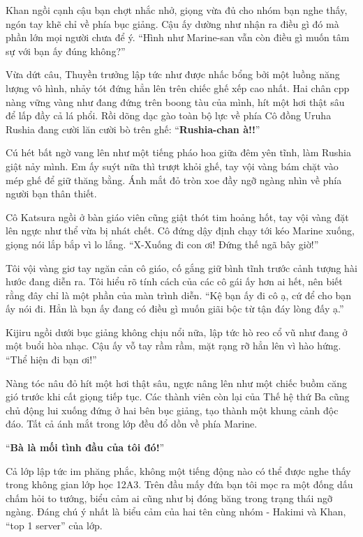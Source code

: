 \documentclass[../main.tex]{subfiles}
\begin{document}
Khan ngồi cạnh cậu bạn chợt nhắc nhở, giọng vừa đủ cho nhóm bạn nghe thấy, ngón tay khẽ chỉ về phía bục giảng. Cậu ấy dường như nhận ra điều gì đó mà phần lớn mọi người chưa để ý. ``Hình như Marine-san vẫn còn điều gì muốn tâm sự với bạn ấy đúng không?''

Vừa dứt câu, Thuyền trưởng lập tức như được nhấc bổng bởi một luồng năng lượng vô hình, nhảy tót đứng hẳn lên trên chiếc ghế xếp cao nhất. Hai chân cpp nàng vững vàng như đang đứng trên boong tàu của mình, hít một hơi thật sâu để lấp đầy cả lá phổi. Rồi dõng dạc gào toàn bộ lực về phía Cô đồng Uruha Rushia đang cười lăn cười bò trên ghế: ``\textbf{Rushia-chan à!!}''

Cú hét bất ngờ vang lên như một tiếng pháo hoa giữa đêm yên tĩnh, làm Rushia giật nảy mình. Em ấy suýt nữa thì trượt khỏi ghế, tay vội vàng bám chặt vào mép ghế để giữ thăng bằng. Ánh mắt đỏ tròn xoe đầy ngỡ ngàng nhìn về phía người bạn thân thiết.

Cô Katsura ngồi ở bàn giáo viên cũng giật thót tim hoảng hốt, tay vội vàng đặt lên ngực như thể vừa bị nhát chết. Cô đứng dậy định chạy tới kéo Marine xuống, giọng nói lắp bắp vì lo lắng. ``X-Xuống đi con ơi! Đứng thế ngã bây giờ!''

Tôi vội vàng giơ tay ngăn cản cô giáo, cố gắng giữ bình tĩnh trước cảnh tượng hài hước đang diễn ra. Tôi hiểu rõ tính cách của các cô gái ấy hơn ai hết, nên biết rằng đây chỉ là một phần của màn trình diễn. ``Kệ bạn ấy đi cô ạ, cứ để cho bạn ấy nói đi. Hẳn là bạn ấy đang có điều gì muốn giãi bộc từ tận đáy lòng đấy ạ.''

Kijiru ngồi dưới bục giảng không chịu nổi nữa, lập tức hò reo cổ vũ như đang ở một buổi hòa nhạc. Cậu ấy vỗ tay rầm rầm, mặt rạng rỡ hẳn lên vì hào hứng. ``Thể hiện đi bạn ơi!''

Nàng tóc nâu đỏ hít một hơi thật sâu, ngực nâng lên như một chiếc buồm căng gió trước khi cất giọng tiếp tục. Các thành viên còn lại của Thế hệ thứ Ba cũng chủ động lui xuống đứng ở hai bên bục giảng, tạo thành một khung cảnh độc đáo. Tất cả ánh mắt trong lớp đều đổ dồn về phía Marine.

``\textbf{Bà là mối tình đầu của tôi đó!}''

Cả lớp lập tức im phăng phắc, không một tiếng động nào có thể được nghe thấy trong không gian lớp học 12A3. Trên đầu mấy đứa bạn tôi mọc ra một đống dấu chấm hỏi to tướng, biểu cảm ai cũng như bị đóng băng trong trạng thái ngỡ ngàng. Đáng chú ý nhất là biểu cảm của hai tên cùng nhóm - Hakimi và Khan, ``top 1 server'' của lớp.
\end{document}

